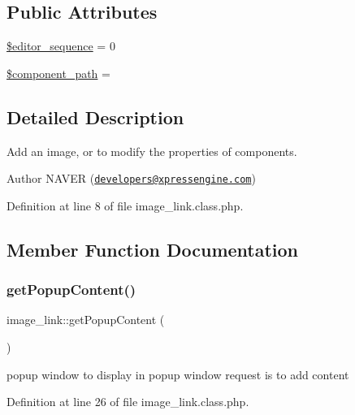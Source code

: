 \subsection*{Public Attributes}
\begin{DoxyCompactItemize}
\item 
\hyperlink{classimage__link_af783692826f89b17fa6e9cf21d4f0f8b}{\$editor\+\_\+sequence} = 0
\item 
\hyperlink{classimage__link_ae68f572cbf4ce0aaa8ac20dd6b98a2f0}{\$component\+\_\+path} = \textquotesingle{}\textquotesingle{}
\end{DoxyCompactItemize}


\subsection{Detailed Description}
Add an image, or to modify the properties of components. 

\begin{DoxyAuthor}{Author}
N\+A\+V\+ER (\href{mailto:developers@xpressengine.com}{\tt developers@xpressengine.\+com}) 
\end{DoxyAuthor}


Definition at line 8 of file image\+\_\+link.\+class.\+php.



\subsection{Member Function Documentation}
\hypertarget{classimage__link_a394ef807a2b750c5b3f0041eb7ab4aaf}{}\label{classimage__link_a394ef807a2b750c5b3f0041eb7ab4aaf} 
\subsubsection{\texorpdfstring{get\+Popup\+Content()}{getPopupContent()}}
{\footnotesize\ttfamily image\+\_\+link\+::get\+Popup\+Content (\begin{DoxyParamCaption}{ }\end{DoxyParamCaption})}



popup window to display in popup window request is to add content 



Definition at line 26 of file image\+\_\+link.\+class.\+php.

